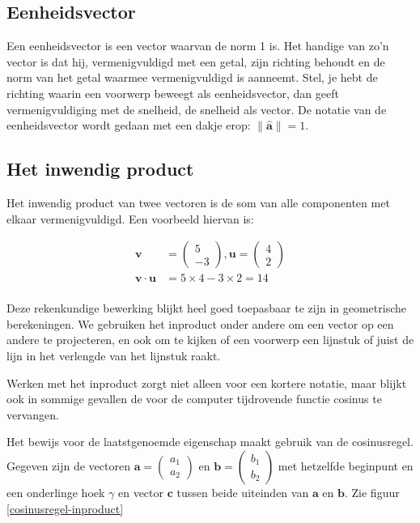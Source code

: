 \documentclass[12pt,a4paper]{article}
\begin{document}
	\subsection{Eenheidsvector}
	Een eenheidsvector is een vector waarvan de norm 1 is. Het handige van zo'n vector is dat hij, vermenigvuldigd met een getal, zijn richting behoudt en de norm van het getal waarmee vermenigvuldigd is aanneemt. Stel, je hebt de richting waarin een voorwerp beweegt als eenheidsvector, dan geeft vermenigvuldiging met de snelheid, de snelheid als vector. De notatie van de eenheidsvector wordt gedaan met een dakje erop: $\|\mathbf{\hat{a}}\| = 1$.
	
	\subsection{Het inwendig product}
	Het inwendig product van twee vectoren is de som van alle componenten met elkaar vermenigvuldigd. Een voorbeeld hiervan is:
	
	\begin{equation*}
		\begin{aligned}
			\mathbf{v} &= \begin{pmatrix} 5 \\ -3 \end{pmatrix}, \mathbf{u} = \begin{pmatrix} 4 \\ 2 \end{pmatrix} \\
			\mathbf{v} \cdot \mathbf{u} &= 5 \times 4 -3 \times 2 = 14\\
		\end{aligned}
	\end{equation*}
	
	Deze rekenkundige bewerking blijkt heel goed toepasbaar te zijn in geometrische berekeningen. We gebruiken het inproduct onder andere om een vector op een andere te projecteren, en ook om te kijken of een voorwerp een lijnstuk of juist de lijn in het verlengde van het lijnstuk raakt.

	Werken met het inproduct zorgt niet alleen voor een kortere notatie, maar blijkt ook in sommige gevallen de voor de computer tijdrovende functie cosinus te vervangen.
	
	Het bewijs voor de laatstgenoemde eigenschap maakt gebruik van de cosinusregel. Gegeven zijn de vectoren $\mathbf{a}=\begin{pmatrix} a_1 \\ a_2 \end{pmatrix}$ en $\mathbf{b}=\begin{pmatrix} b_1 \\ b_2 \end{pmatrix}$ met hetzelfde beginpunt en een onderlinge hoek $\gamma$ en vector $\mathbf{c}$ tussen beide uiteinden van $\mathbf{a}$ en $\mathbf{b}$. Zie figuur \ref{cosinusregel-inproduct}
	
\end{document}
